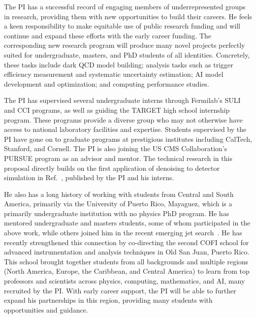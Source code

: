 The PI has a successful record of engaging members of underrepresented groups in research,
providing them with new opportunities to build their careers.
He feels a keen responsibility to make equitable use of public research funding
and will continue and expand these efforts with the early career funding.
The corresponding new research program will produce many novel projects
perfectly suited for undergraduate, masters, and PhD students of all identities.
Concretely, these tasks include dark QCD model building;
analysis tasks such as trigger efficiency measurement and systematic uncertainty estimation;
AI model development and optimization; and computing performance studies.

The PI has supervised several undergraduate interns through Fermilab's SULI and CCI programs,
as well as guiding the TARGET high school internship program.
These programs provide a diverse group who may not otherwise have access to national laboratory facilities and expertise.
Students supervised by the PI have gone on to graduate programs at prestigious institutes including CalTech, Stanford, and Cornell.
The PI is also joining the US CMS Collaboration's PURSUE program as an advisor and mentor.
The technical research in this proposal directly builds on the first application of denoising to detector simulation in Ref.~\cite{Banerjee:2022gkg},
published by the PI and his interns.

He also has a long history of working with students from Central and South America,
primarily via the University of Puerto Rico, Mayaguez, which is a primarily undergraduate institution with no physics PhD program.
He has mentored undergraduate and masters students, some of whom participated in the above work,
while others joined him in the recent emerging jet search~\cite{CMS:2024emj}.
He has recently strengthened this connection by co-directing
the second COFI school for advanced instrumentation and analysis techniques in Old San Juan, Puerto Rico.
This school brought together students from all backgrounds and multiple regions (North America, Europe, the Caribbean, and Central America)
to learn from top professors and scientists across physics, computing, mathematics, and AI, many recruited by the PI.
With early career support, the PI will be able to further expand his partnerships in this region,
providing many students with opportunities and guidance.

